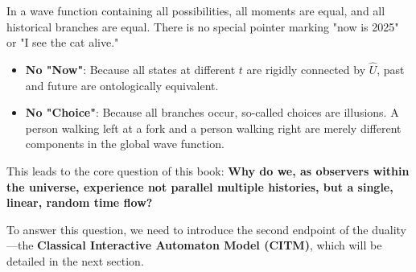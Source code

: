In a wave function containing all possibilities, all moments are equal, and all historical branches are equal. There is no special pointer marking "now is 2025" or "I see the cat alive."

\begin{itemize}
\item \textbf{No "Now"}: Because all states at different $t$ are rigidly connected by $\hat{U}$, past and future are ontologically equivalent.

\item \textbf{No "Choice"}: Because all branches occur, so-called choices are illusions. A person walking left at a fork and a person walking right are merely different components in the global wave function.
\end{itemize}

This leads to the core question of this book: \textbf{Why do we, as observers within the universe, experience not parallel multiple histories, but a single, linear, random time flow?}

To answer this question, we need to introduce the second endpoint of the duality—the \textbf{Classical Interactive Automaton Model (CITM)}, which will be detailed in the next section.
